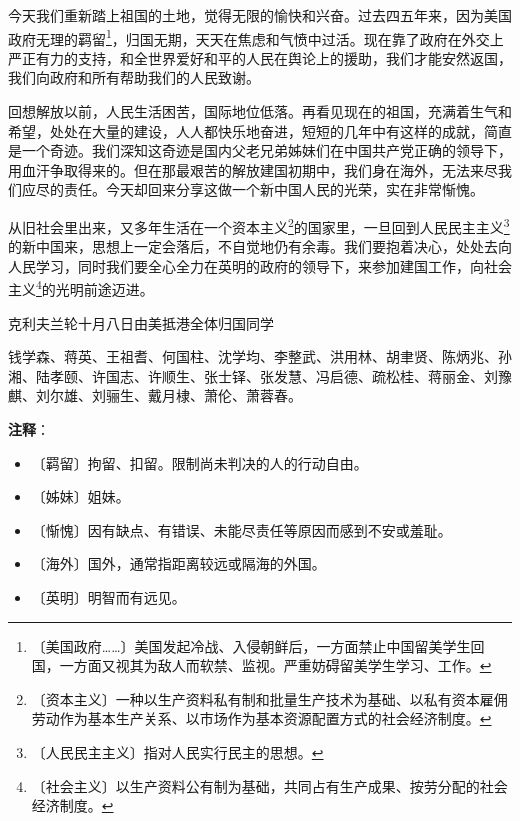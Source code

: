 \documentclass[12pt,UTF-8,openany]{ctexbook}
\begin{document}
\begin{large}
    
    今天我们重新踏上祖国的土地，觉得无限的愉快和兴奋。过去四五年来，因为美国政府无理的羁留\footnote{〔美国政府……〕美国发起冷战、入侵朝鲜后，一方面禁止中国留美学生回国，一方面又视其为敌人而软禁、监视。严重妨碍留美学生学习、工作。}，归国无期，天天在焦虑和气愤中过活。现在靠了政府在外交上严正有力的支持，和全世界爱好和平的人民在舆论上的援助，我们才能安然返国，我们向政府和所有帮助我们的人民致谢。
    
    回想解放以前，人民生活困苦，国际地位低落。再看见现在的祖国，充满着生气和希望，处处在大量的建设，人人都快乐地奋进，短短的几年中有这样的成就，简直是一个奇迹。我们深知这奇迹是国内父老兄弟姊妹们在中国共产党正确的领导下，用血汗争取得来的。但在那最艰苦的解放建国初期中，我们身在海外，无法来尽我们应尽的责任。今天却回来分享这做一个新中国人民的光荣，实在非常惭愧。
    
    从旧社会里出来，又多年生活在一个资本主义\footnote{〔资本主义〕一种以生产资料私有制和批量生产技术为基础、以私有资本雇佣劳动作为基本生产关系、以市场作为基本资源配置方式的社会经济制度。}的国家里，一旦回到人民民主主义\footnote{〔人民民主主义〕指对人民实行民主的思想。}的新中国来，思想上一定会落后，不自觉地仍有余毒。我们要抱着决心，处处去向人民学习，同时我们要全心全力在英明的政府的领导下，来参加建国工作，向社会主义\footnote{〔社会主义〕以生产资料公有制为基础，共同占有生产成果、按劳分配的社会经济制度。}的光明前途迈进。
    
    \hfill 克利夫兰轮十月八日由美抵港全体归国同学
    
    \hfill 钱学森、蒋英、王祖耆、何国柱、沈学均、李整武、洪用林、胡聿贤、陈炳兆、孙湘、陆孝颐、许国志、许顺生、张士铎、张发慧、冯启德、疏松桂、蒋丽金、刘豫麒、刘尔雄、刘骊生、戴月棣、萧伦、萧蓉春。
    
\end{large}


\newpage

\textbf{注释}：

\vspace{-1em}

\begin{itemize}
    \setlength\itemsep{-0.2em}
    \item 〔羁留〕拘留、扣留。限制尚未判决的人的行动自由。
    \item 〔姊妹〕姐妹。
    \item 〔惭愧〕因有缺点、有错误、未能尽责任等原因而感到不安或羞耻。
    \item 〔海外〕国外，通常指距离较远或隔海的外国。
    \item 〔英明〕明智而有远见。
\end{itemize}
\end{document}
